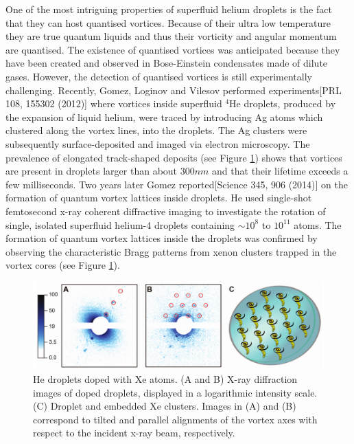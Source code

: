 		One of the most intriguing properties of superfluid helium droplets is the fact that they can host quantised vortices. Because of their ultra low temperature they are true quantum liquids and thus their vorticity and angular momentum are quantised. The existence of quantised vortices was anticipated because they have been created and observed in Bose-Einstein condensates made of dilute gases. However, the detection of quantised vortices is still experimentally challenging. Recently, Gomez, Loginov and Vilesov performed experiments[PRL 108, 155302 (2012)] where vortices inside superfluid $^4$He droplets, produced by the expansion of liquid helium, were traced by introducing Ag atoms which clustered along the vortex lines, into the droplets. The Ag clusters were subsequently surface-deposited and imaged via electron microscopy. The prevalence of elongated track-shaped deposits (see Figure \ref{fig:vortex-array}) shows that vortices are present in droplets larger than about $300\unit{nm}$ and that their lifetime exceeds a few milliseconds. Two years later Gomez reported[Science 345, 906 (2014)] on the formation of quantum vortex lattices inside droplets. He used single-shot femtosecond x-ray coherent diffractive imaging to investigate the rotation of single, isolated superfluid helium-4 droplets containing $\sim\!10^8$ to $10^{11}$ atoms. The formation of quantum vortex lattices inside the droplets was confirmed by observing the characteristic Bragg patterns from xenon clusters trapped in the vortex cores (see Figure \ref{fig:vortex-array}).\\

		\begin{figure}[t]
			\begin{center}
				\includegraphics[width=\textwidth]{vortex-array}
				\caption{He droplets doped with Xe atoms. (A and B) X-ray diffraction images of doped droplets, displayed in a logarithmic intensity scale. (C) Droplet and embedded Xe clusters. Images in (A) and (B) correspond to tilted and parallel alignments of the vortex axes with respect to the incident x-ray beam, respectively.}
				\label{fig:vortex-array}
			\end{center}
		\end{figure}
				
